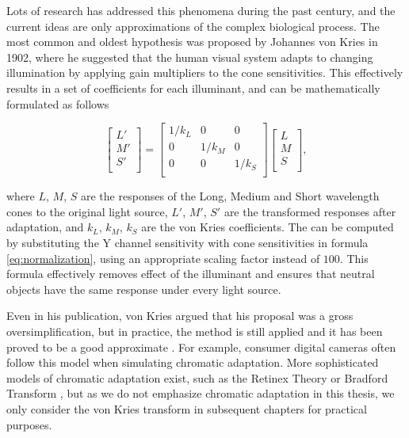 Lots of research has addressed this phenomena during the past century, and the current ideas are only approximations of the complex biological process. The most common and oldest hypothesis was proposed by Johannes von Kries in 1902, where he suggested that the human visual system adapts to changing illumination by applying gain multipliers to the cone sensitivities. \cite[168-171]{fairchild} This effectively results in a set of coefficients for each illuminant, and can be mathematically formulated as follows

\begin{equation}
\begin{bmatrix}
L' \\
M' \\
S' \\
\end{bmatrix}
=
\begin{bmatrix}
1/k_L & 0 & 0 \\
0 & 1/k_M & 0 \\
0 & 0 & 1/k_S \\
\end{bmatrix}
\begin{bmatrix}
L \\
M \\
S \\
\end{bmatrix}
,
\end{equation}

where $L$, $M$, $S$ are the responses of the Long, Medium and Short wavelength cones to the original light source, $L'$, $M'$, $S'$ are the transformed responses after adaptation, and $k_L$, $k_M$, $k_S$ are the von Kries coefficients. The can be computed by substituting the Y channel sensitivity with cone sensitivities in formula \ref{eq:normalization}, using an appropriate scaling factor instead of $100$. This formula effectively removes effect of the illuminant and ensures that neutral objects have the same response under every light source.

Even in his publication, von Kries argued that his proposal was a gross oversimplification, but in practice, the method is still applied and it has been proved to be a good approximate \cite[170-171]{fairchild}. For example, consumer digital cameras often follow this model when simulating chromatic adaptation. More sophisticated models of chromatic adaptation exist, such as the Retinex Theory \cite{land1977retinex} or Bradford Transform \cite{lam1985metamerism}, but as we do not emphasize chromatic adaptation in this thesis, we only consider the von Kries transform in subsequent chapters for practical purposes.